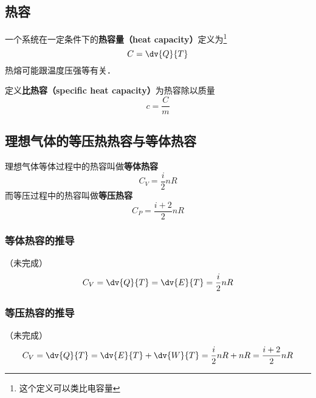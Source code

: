 
\subsection{热容}
一个系统在一定条件下的\textbf{热容量（heat capacity）}定义为\footnote{这个定义可以类比电容量}
\begin{equation}
C = \dv{Q}{T}
\end{equation}
热熔可能跟温度压强等有关．

定义\textbf{比热容（specific heat capacity）}为热容除以质量
\begin{equation}
c = \frac{C}{m}
\end{equation}

\subsection{理想气体的等压热热容与等体热容}
理想气体等体过程中的热容叫做\textbf{等体热容}
\begin{equation}\label{ThCapa_eq1}
C_V = \frac{i}{2} n R
\end{equation}
而等压过程中的热容叫做\textbf{等压热容}
\begin{equation}\label{ThCapa_eq2}
C_P = \frac{i+2}{2} n R
\end{equation}

\subsubsection{等体热容的推导}
（未完成）
\begin{equation}
C_V = \dv{Q}{T} = \dv{E}{T} = \frac{i}{2} nR
\end{equation}

\subsubsection{等压热容的推导}
（未完成）
\begin{equation}
C_V = \dv{Q}{T} = \dv{E}{T} + \dv{W}{T} = \frac{i}{2} nR + nR = \frac{i+2}{2} nR
\end{equation}

